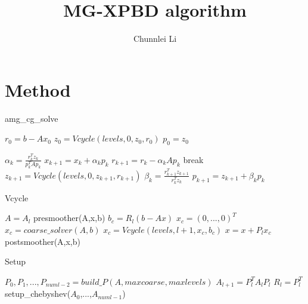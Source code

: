 \documentclass{article}
\title{MG-XPBD algorithm}
\author{Chunnlei Li}
\begin{document}
\maketitle

\section{Method}
\begin{algorithm}
    \begin{algorithmic}[1]
    \caption{amg\_cg\_solve}
    \label{algo:AMG_CG_Solve}
    
    \State $r_0 = b-A x_0$
    \State $z_0 =Vcycle(levels,0,z_{0},r_{0})$
    \State $p_0=z_0$

        \State $\alpha_k = \frac{r_k^T z_k}{p_k^T A p_k}$
        \State $x_{k+1} = x_k + \alpha_k p_k$
        \State $r_{k+1} = r_k - \alpha_k A p_k$
            \State break
        \EndIf
        \State $z_{k+1} = Vcycle(levels,0,z_{k+1},r_{k+1})$
        \State $\beta_k = \frac{r_{k+1}^T z_{k+1}}{r_k^T z_k}$
        \State $p_{k+1} = z_{k+1} + \beta_k p_k$
    \EndFor
\end{algorithmic}
\end{algorithm}




\begin{algorithm}
    \begin{algorithmic}[1]
    \caption{Vcycle}
    \label{algo:Vcycle}
    \State $A = A_l$
    \State presmoother(A,x,b)
    \State $b_c = R_{l} (b - A x)$
    \State $x_c = (0,...,0)^T$
        \State $x_c = coarse\_solver(A,b)$
    \Else
        \State $x_c = Vcycle(levels,l+1,x_c,b_c)$
    \EndIf
    \State $x = x + P_{l} x_c$
    \State postsmoother(A,x,b)
\end{algorithmic}
\end{algorithm}



\begin{algorithm}
    \begin{algorithmic}[1]
    \caption{Setup}
    \label{algo:setup}
    \State $P_0,P_1,...,P_{numl-2} = build\_P(A,maxcoarse,maxlevels)$
        \State $A_{l+1} = P_l^T A_l P_l$
        \State $R_l = P_l^T$
    \EndFor
    \State setup\_chebyshev($A_0$,...,$A_{numl-1}$)
\end{algorithmic}
\end{algorithm}
\end{document}
